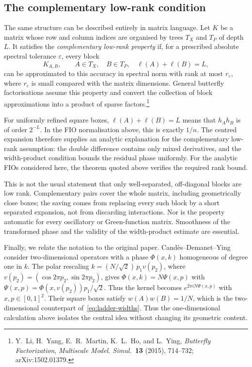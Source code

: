 \subsection{The complementary low-rank condition}
\label{subsec:complementary-low-rank}

The same structure can be described entirely in matrix language. Let $K$ be a matrix whose row and column indices are organised by trees $T_X$ and $T_P$ of depth $L$. It satisfies the \emph{complementary low-rank property} if, for a prescribed absolute spectral tolerance $\varepsilon$, every block
\begin{equation}
    K_{A,B},\qquad A\in T_X,\quad B\in T_P,
    \quad \ell(A)+\ell(B)=L,
\end{equation}
can be approximated to this accuracy in spectral norm with rank at most $r_\varepsilon$, where $r_\varepsilon$ is small compared with the matrix dimensions. General butterfly factorisations assume this property and convert the collection of block approximations into a product of sparse factors.\footnote{Y.~Li, H.~Yang, E.~R.~Martin, K.~L.~Ho, and L.~Ying, \emph{Butterfly Factorization}, \emph{Multiscale Model. Simul.}~\textbf{13} (2015), 714--732; arXiv:1502.01379.}

For uniformly refined square boxes, $\ell(A)+\ell(B)=L$ means that $h_Ah_B$ is of order $2^{-L}$. In the FIO normalisation above, this is exactly $1/n$. The centred expansion therefore supplies an analytic explanation for the complementary low-rank assumption: the double difference contains only mixed derivatives, and the width-product condition bounds the residual phase uniformly. For the analytic FIOs considered here, the theorem quoted above verifies the required rank bound.

This is not the usual statement that only well-separated, off-diagonal blocks are low rank. Complementary pairs cover the whole matrix, including geometrically close boxes; the saving comes from replacing every such block by a short separated expansion, not from discarding interactions. Nor is the property automatic for every oscillatory or Green-function matrix. Smoothness of the transformed phase and the validity of the width-product estimate are essential.

Finally, we relate the notation to the original paper. Cand\`{e}s--Demanet--Ying consider two-dimensional operators with a phase $\Phi(x,k)$ homogeneous of degree one in $k$. The polar rescaling $k=(N/\sqrt2)\,p_1v(p_2)$, where $v(p_2)=(\cos 2\pi p_2,\sin 2\pi p_2)$, gives $\Phi(x,k)=N\Psi(x,p)$ with $\Psi(x,p)=\Phi(x,v(p_2))p_1/\sqrt2$. Thus the kernel becomes $e^{2\pi i N\Psi(x,p)}$ with $x,p\in[0,1]^2$. Their square boxes satisfy $w(A)w(B)=1/N$, which is the two-dimensional counterpart of~\eqref{eq:ladder-widths}. Thus the one-dimensional calculation above isolates the central idea without changing its geometric content.

